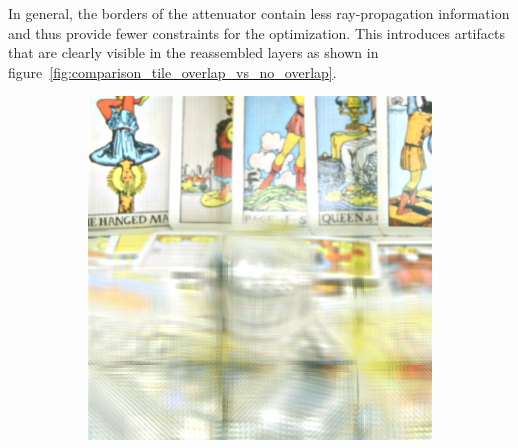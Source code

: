 In general, the borders of the attenuator contain less ray-propagation information and thus provide fewer constraints for the optimization. 
This introduces artifacts that are clearly visible in the reassembled layers as shown in figure~\ref{fig:comparison_tile_overlap_vs_no_overlap}.
\begin{figure}[tb]
	\centering
	\begin{subfigure}{0.23\textwidth}
		\includegraphics[width = \textwidth]{../Figures/tiling/tarot_tiles3x3x200x200_no_overlap_3_layers/1.png}
		
		\vspace{0.15cm}
		

\end{subfigure}
\end{figure}
